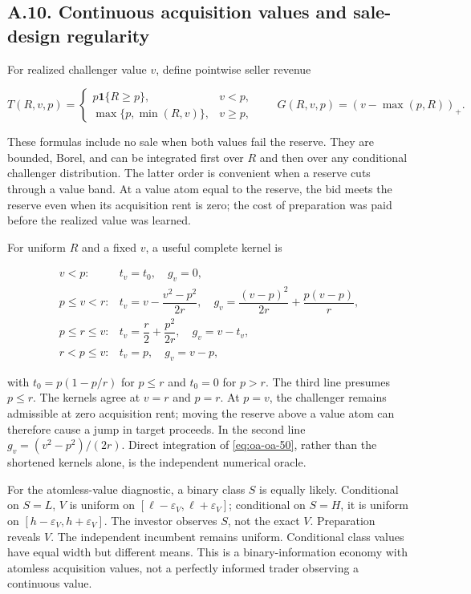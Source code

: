 \documentclass[
  11pt,
]{article}
\begin{document}
\subsection{A.10. Continuous acquisition values and sale-design
regularity}\label{oa-a-design}

For realized challenger value \(v\), define pointwise seller revenue

\[
T(R,v,p)=
\begin{cases}
p\mathbf1\{R\ge p\},&v<p,\\
\max\{p,\min(R,v)\},&v\ge p,
\end{cases}
\qquad
G(R,v,p)=(v-\max(p,R))_+.
\tag{OA.50}\label{eq:oa-oa-50}
\]

These formulas include no sale when both values fail the reserve. They
are bounded, Borel, and can be integrated first over \(R\) and then over
any conditional challenger distribution. The latter order is convenient
when a reserve cuts through a value band. At a value atom equal to the
reserve, the bid meets the reserve even when its acquisition rent is
zero; the cost of preparation was paid before the realized value was
learned.

For uniform \(R\) and a fixed \(v\), a useful complete kernel is

\[
\begin{array}{ll}
v<p:&t_v=t_0,\quad g_v=0,\\
p\le v<r:&t_v=v-\dfrac{v^2-p^2}{2r},\quad g_v=\dfrac{(v-p)^2}{2r}+\dfrac{p(v-p)}r,\\
p\le r\le v:&t_v=\dfrac r2+\dfrac{p^2}{2r},\quad g_v=v-t_v,\\
r<p\le v:&t_v=p,\quad g_v=v-p,
\end{array}
\tag{OA.51}\label{eq:oa-oa-51}
\]

with \(t_0=p(1-p/r)\) for \(p\le r\) and \(t_0=0\) for \(p>r\). The
third line presumes \(p\le r\). The kernels agree at \(v=r\) and
\(p=r\). At \(p=v\), the challenger remains admissible at zero
acquisition rent; moving the reserve above a value atom can therefore
cause a jump in target proceeds. In the second line
\(g_v=(v^2-p^2)/(2r)\). Direct integration of \eqref{eq:oa-oa-50},
rather than the shortened kernels alone, is the independent numerical
oracle.

For the atomless-value diagnostic, a binary class \(S\) is equally
likely. Conditional on \(S=L\), \(V\) is uniform on
\([\ell-\varepsilon_V,\ell+\varepsilon_V]\); conditional on \(S=H\), it
is uniform on \([h-\varepsilon_V,h+\varepsilon_V]\). The investor
observes \(S\), not the exact \(V\). Preparation reveals \(V\). The
independent incumbent remains uniform. Conditional class values have
equal width but different means. This is a binary-information economy
with atomless acquisition values, not a perfectly informed trader
observing a continuous value.
\end{document}
